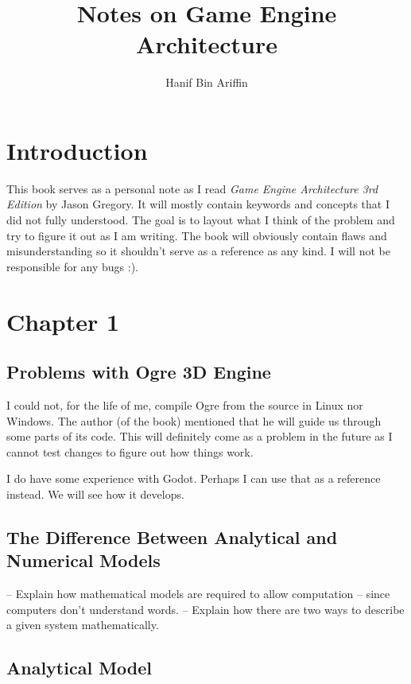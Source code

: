 \documentclass[a4paper,12pt]{book}
\author{Hanif Bin Ariffin}
\title{Notes on Game Engine Architecture}
\begin{document}
\maketitle
\tableofcontents


\section{Introduction}

This book serves as a personal note as I read \textit{Game Engine Architecture 3rd Edition} by Jason Gregory.
It will mostly contain keywords and concepts that I did not fully understood.
The goal is to layout what I think of the problem and try to figure it out as I am writing.
The book will obviously contain flaws and misunderstanding so it shouldn't serve as a reference as any kind.
I will not be responsible for any bugs :).

\newpage
\section{Chapter 1}
\subsection{Problems with Ogre 3D Engine}

I could not, for the life of me, compile Ogre from the source in Linux nor Windows.
The author (of the book) mentioned that he will guide us through some parts of its code.
This will definitely come as a problem in the future as I cannot test changes to figure out how things work.

I do have some experience with Godot.
Perhaps I can use that as a reference instead.
We will see how it develops.

\subsection{The Difference Between Analytical and Numerical Models}

-- Explain how mathematical models are required to allow computation -- since computers don't understand words.
-- Explain how there are two ways to describe a given system mathematically.

\subsection{Analytical Model}
\end{document}
